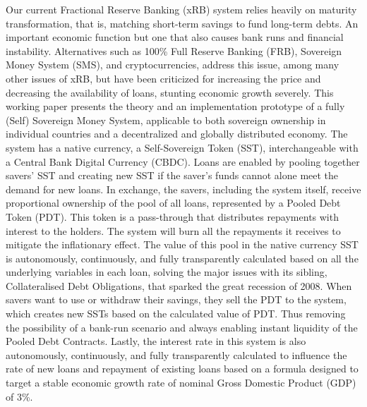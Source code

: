 Our current Fractional Reserve Banking (xRB) system relies heavily on maturity transformation, that is, matching short-term savings to fund long-term debts. An important economic function but one that also causes bank runs and financial instability. Alternatives such as 100\% Full Reserve Banking (FRB), Sovereign Money System (SMS), and cryptocurrencies, address this issue, among many other issues of xRB, but have been criticized for increasing the price and decreasing the availability of loans, stunting economic growth severely. This working paper presents the theory and an implementation prototype of a fully (Self) Sovereign Money System, applicable to both sovereign ownership in individual countries and a decentralized and globally distributed economy. The system has a native currency, a Self-Sovereign Token (SST), interchangeable with a Central Bank Digital Currency (CBDC). Loans are enabled by pooling together savers' SST and creating new SST if the saver's funds cannot alone meet the demand for new loans. In exchange, the savers, including the system itself, receive proportional ownership of the pool of all loans, represented by a Pooled Debt Token (PDT). This token is a pass-through that distributes repayments with interest to the holders. The system will burn all the repayments it receives to mitigate the inflationary effect. The value of this pool in the native currency SST is autonomously, continuously, and fully transparently calculated based on all the underlying variables in each loan, solving the major issues with its sibling, Collateralised Debt Obligations, that sparked the great recession of 2008. When savers want to use or withdraw their savings, they sell the PDT to the system, which creates new SSTs based on the calculated value of PDT. Thus removing the possibility of a bank-run scenario and always enabling instant liquidity of the Pooled Debt Contracts. Lastly, the interest rate in this system is also autonomously, continuously, and fully transparently calculated to influence the rate of new loans and repayment of existing loans based on a formula designed to target a stable economic growth rate of nominal Gross Domestic Product (GDP) of 3\%.  